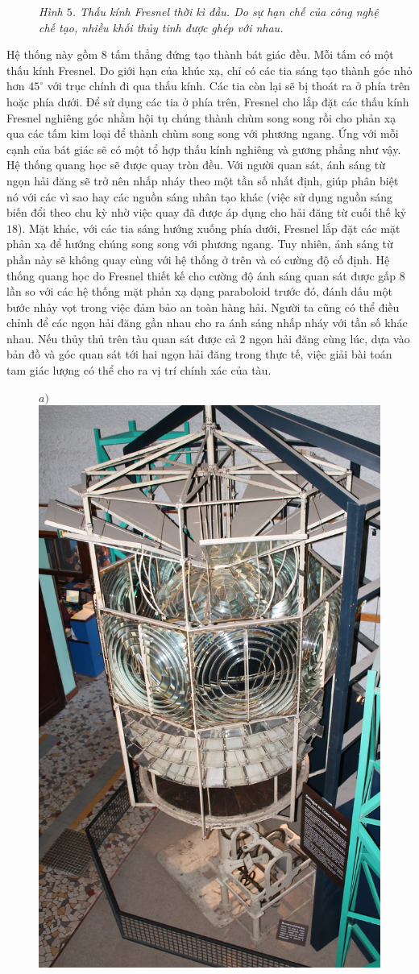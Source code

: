 \begin{multicols}{2}
\begin{figure}[H]
		\caption{\small\textit{\color{timhieukhoahoc}Hình $5$. Thấu kính Fresnel thời kì đầu. Do sự hạn chế của công nghệ chế tạo, nhiều khối thủy tinh được ghép với nhau.}}
		\vspace*{-10pt}
	\end{figure}
	Hệ thống này gồm $8$ tấm thẳng đứng tạo thành bát giác đều. Mỗi tấm có một thấu kính Fresnel. Do giới hạn của khúc xạ, chỉ có các tia sáng tạo thành góc nhỏ hơn $45^\circ$ với trục chính đi qua thấu kính. Các tia còn lại sẽ bị thoát ra ở phía trên hoặc phía dưới. Để sử dụng các tia ở phía trên, Fresnel cho lắp đặt các thấu kính Fresnel nghiêng góc nhằm hội tụ chúng thành chùm song song rồi cho phản xạ qua các tấm kim loại để thành chùm song song với phương ngang. Ứng với mỗi cạnh của bát giác sẽ có một tổ hợp thấu kính nghiêng và gương phẳng như vậy. Hệ thống quang học sẽ được quay tròn đều. Với người quan sát, ánh sáng từ ngọn hải đăng sẽ trở nên nhấp nháy theo một tần số nhất định, giúp phân biệt nó với các vì sao hay các nguồn sáng nhân tạo khác (việc sử dụng nguồn sáng biến đổi theo chu kỳ nhờ việc quay đã được áp dụng cho hải đăng từ cuối thế kỷ $18$). Mặt khác, với các tia sáng hướng xuống phía dưới, Fresnel lắp đặt các mặt phản xạ để hướng chúng song song với phương ngang. Tuy nhiên, ánh sáng từ phần này sẽ không quay cùng với hệ thống ở trên và có cường độ cố định. Hệ thống quang học do Fresnel thiết kế cho cường độ ánh sáng quan sát được gấp $8$ lần so với các hệ thống mặt phản xạ dạng paraboloid trước đó, đánh dấu một bước nhảy vọt trong việc đảm bảo an toàn hàng hải. Người ta cũng có thể điều chỉnh để các ngọn hải đăng gần nhau cho ra ánh sáng nhấp nháy với tần số khác nhau. Nếu thủy thủ trên tàu quan sát được cả $2$ ngọn hải đăng cùng lúc, dựa vào bản đồ và góc quan sát tới hai ngọn hải đăng trong thực tế, việc giải bài toán tam giác lượng có thể cho ra vị trí chính xác của tàu.
	\begin{figure}[H]
		\vspace*{-5pt}
		\centering
		\captionsetup{labelformat= empty, justification=centering}
		$a)$\includegraphics[width= 0.43\linewidth]{7a}

\end{figure}
\end{multicols}
